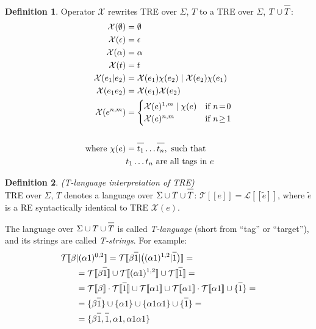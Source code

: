 \documentclass{article}
\newcommand{\Xeq}{\!=\!}
\newcommand{\Xlb}{[\![}
\newcommand{\Xrb}{]\!]}
\newcommand{\XL}{\mathcal{L}}
\newcommand{\XT}{\mathcal{T}}
\newcommand{\XX}{\mathcal{X}}
\newcommand*{\Xbar}[1]{\overline{#1\vphantom{\bar{#1}}}}
\theoremstyle{definition}
\newtheorem{Xdef}{Definition}
\begin{document}
\begin{multicols}{2}
    \begin{Xdef}\label{deftlang}
    Operator $\XX$ rewrites TRE over $\Sigma$, $T$ to a TRE over $\Sigma$, $T \cup \Xbar{T}$:
    \begin{align*}
        \XX(\emptyset) &= \emptyset \\
        \XX(\epsilon) &= \epsilon \\
        \XX(\alpha) &= \alpha \\
        \XX(t) &= t \\
        \XX(e_1 | e_2)
            &=      \XX(e_1) \chi(e_2) \mid \XX(e_2) \chi(e_1) \\
        \XX(e_1 e_2) &= \XX(e_1) \XX(e_2) \\
        \XX(e^{n,m}) &= \begin{cases}
                \XX(e)^{1,m} \mid \chi(e) &\text{if } n \Xeq 0 \\
                \XX(e)^{n,m} &\text{if } n \!\geq\! 1
            \end{cases} \\
        \\
        \text{where }
            \chi(e) &= \Xbar{t_1} \dots \Xbar{t_n}, \text{ such that} \\
                &t_1 \dots t_n \text{ are all tags in } e
    \end{align*}
    \end{Xdef}

    \begin{Xdef}\label{deftlang}
    \emph{(T-language interpretation of TRE)} \\
    TRE over $\Sigma$, $T$ denotes a language over $\Sigma \cup T \cup \Xbar{T}$:
    $\XT \Xlb e \Xrb = \XL \Xlb \widetilde{e} \Xrb$, where $\widetilde{e}$ is a RE
    syntactically identical to TRE $\XX(e)$.
    \end{Xdef}

The language over $\Sigma \cup T \cup \Xbar{T}$ is called \emph{T-language}
(short from ``tag'' or ``target''), and its strings are called \emph{T-strings}.
For example:
\begin{align*}
    \XT \Xlb \beta &| (\alpha 1)^{0,2} \Xrb
=
    \XT \Xlb \beta \Xbar{1} | \big( (\alpha 1)^{1,2} | \Xbar{1} \big) \Xrb = \\
&=
    \XT \Xlb \beta \Xbar{1} \Xrb
        \cup \XT \Xlb (\alpha 1)^{1,2} \Xrb
        \cup \XT \Xlb \Xbar{1} \Xrb = \\
&=
    \XT \Xlb \beta \Xrb
        \cdot \XT \Xlb \Xbar{1} \Xrb \cup
    \XT \Xlb \alpha 1 \Xrb
            \cup \XT \Xlb \alpha 1 \Xrb \cdot \XT \Xlb \alpha 1 \Xrb
        \cup \{\Xbar{1}\} = \\
&=
    \{\beta \Xbar{1}\} \cup
    \{\alpha 1 \} \cup
    \{\alpha 1 \alpha 1 \} \cup
    \{\Xbar{1}\} = \\
&=
    \{\beta \Xbar{1}, \Xbar{1}, \alpha 1, \alpha 1 \alpha 1 \}
\end{align*}


\end{multicols}
\end{document}
